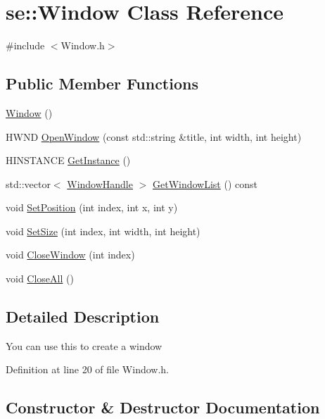 \hypertarget{classse_1_1_window}{}\section{se\+:\+:Window Class Reference}
\label{classse_1_1_window}


{\ttfamily \#include $<$Window.\+h$>$}

\subsection*{Public Member Functions}
\begin{DoxyCompactItemize}
\item 
\mbox{\hyperlink{classse_1_1_window_a903d67c495507f0ece8d2976a33b8540}{Window}} ()
\item 
H\+W\+ND \mbox{\hyperlink{classse_1_1_window_a0bc98ce202ef1c431fe2780d53dbe7da}{Open\+Window}} (const std\+::string \&title, int width, int height)
\item 
H\+I\+N\+S\+T\+A\+N\+CE \mbox{\hyperlink{classse_1_1_window_af85337c4cc5eae56412a5bbcbf471ae6}{Get\+Instance}} ()
\item 
std\+::vector$<$ \mbox{\hyperlink{structse_1_1_window_handle}{Window\+Handle}} $>$ \mbox{\hyperlink{classse_1_1_window_a3469863d327e48f06837f772d066e1e7}{Get\+Window\+List}} () const
\item 
void \mbox{\hyperlink{classse_1_1_window_a12c371c25615c9d4744a961dab9d949c}{Set\+Position}} (int index, int x, int y)
\item 
void \mbox{\hyperlink{classse_1_1_window_ac5e7a7985934606074e9c65f83f45260}{Set\+Size}} (int index, int width, int height)
\item 
void \mbox{\hyperlink{classse_1_1_window_aab3319947ce4e9cd78f16cd9be9481e5}{Close\+Window}} (int index)
\item 
void \mbox{\hyperlink{classse_1_1_window_aa36e57777577f2b0cf355461b3b0f9a3}{Close\+All}} ()
\end{DoxyCompactItemize}


\subsection{Detailed Description}
You can use this to create a window 

Definition at line 20 of file Window.\+h.



\subsection{Constructor \& Destructor Documentation}
\mbox{\label{classse_1_1_window_a903d67c495507f0ece8d2976a33b8540}} 
